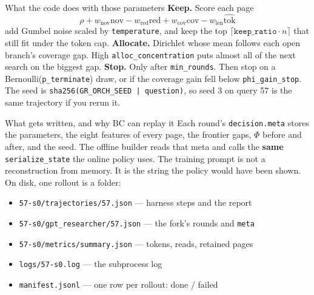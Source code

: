 \documentclass[aspectratio=169,11pt]{beamer}
\begin{document}
\begin{frame}{What the code does with those parameters}
  \textbf{Keep.} Score each page
  \[
    \rho + w_{\mathrm{nov}}\mathrm{nov} - w_{\mathrm{red}}\mathrm{red} + w_{\mathrm{cov}}\mathrm{cov} - w_{\mathrm{len}}\widehat{\mathrm{tok}}
  \]
  add Gumbel noise scaled by \texttt{temperature}, and keep the top $\lceil \texttt{keep\_ratio}\cdot n\rceil$ that still fit under the token cap.
  \vspace{0.35em}
  \textbf{Allocate.} Dirichlet whose mean follows each open branch's coverage gap. High \texttt{alloc\_concentration} puts almost all of the next search on the biggest gap.
  \vspace{0.35em}
  \textbf{Stop.} Only after \texttt{min\_rounds}. Then stop on a Bernoulli(\texttt{p\_terminate}) draw, or if the coverage gain fell below \texttt{phi\_gain\_stop}.
  \vspace{0.35em}
  The seed is \texttt{sha256(GR\_ORCH\_SEED | question)}, so seed 3 on query 57 is the same trajectory if you rerun it.
\end{frame}

\begin{frame}{What gets written, and why BC can replay it}
  Each round's \texttt{decision.meta} stores the parameters, the eight features of every page, the frontier gaps, $\Phi$ before and after, and the seed.
  \vspace{0.3em}
  The offline builder reads that meta and calls the \textbf{same} \texttt{serialize\_state} the online policy uses. The training prompt is not a reconstruction from memory. It is the string the policy would have been shown.
  \vspace{0.4em}
  On disk, one rollout is a folder:
  \begin{itemize}
    \item \texttt{57-s0/trajectories/57.json} --- harness steps and the report
    \item \texttt{57-s0/gpt\_researcher/57.json} --- the fork's rounds and \texttt{meta}
    \item \texttt{57-s0/metrics/summary.json} --- tokens, reads, retained pages
    \item \texttt{logs/57-s0.log} --- the subprocess log
    \item \texttt{manifest.jsonl} --- one row per rollout: done / failed
  \end{itemize}
\end{frame}
\end{document}
